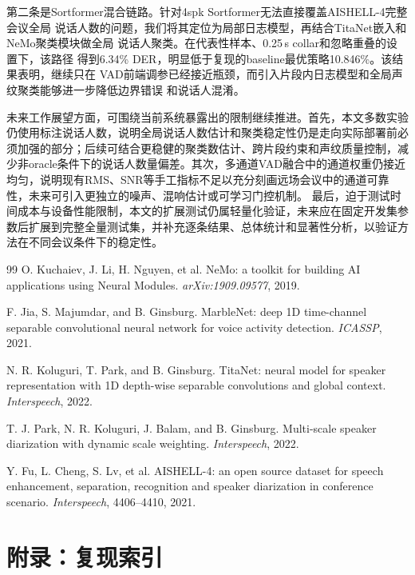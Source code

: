\documentclass[UTF8,a4paper,10pt]{ctexart}
\begin{document}
第二条是Sortformer混合链路。针对4spk Sortformer无法直接覆盖AISHELL-4完整会议全局
说话人数的问题，我们将其定位为局部日志模型，再结合TitaNet嵌入和NeMo聚类模块做全局
说话人聚类。在代表性样本、0.25\,s collar和忽略重叠的设置下，该路径
得到6.34\% DER，明显低于复现的baseline最优策略10.846\%。该结果表明，继续只在
VAD前端调参已经接近瓶颈，而引入片段内日志模型和全局声纹聚类能够进一步降低边界错误
和说话人混淆。

未来工作展望方面，可围绕当前系统暴露出的限制继续推进。首先，本文多数实验仍使用标注说话人数，说明全局说话人数估计和聚类稳定性仍是走向实际部署前必须加强的部分；后续可结合更稳健的聚类数估计、跨片段约束和声纹质量控制，减少非oracle条件下的说话人数量偏差。其次，多通道VAD融合中的通道权重仍接近均匀，说明现有RMS、SNR等手工指标不足以充分刻画远场会议中的通道可靠性，未来可引入更独立的噪声、混响估计或可学习门控机制。
最后，迫于测试时间成本与设备性能限制，本文的扩展测试仍属轻量化验证，未来应在固定开发集参数后扩展到完整全量测试集，并补充逐条结果、总体统计和显著性分析，以验证方法在不同会议条件下的稳定性。


\newpage
\begin{thebibliography}{99}
O. Kuchaiev, J. Li, H. Nguyen, et al.
NeMo: a toolkit for building AI applications using Neural Modules.
\textit{arXiv:1909.09577}, 2019.

F. Jia, S. Majumdar, and B. Ginsburg.
MarbleNet: deep 1D time-channel separable convolutional neural network for
voice activity detection. \textit{ICASSP}, 2021.

N. R. Koluguri, T. Park, and B. Ginsburg.
TitaNet: neural model for speaker representation with 1D depth-wise separable
convolutions and global context. \textit{Interspeech}, 2022.

T. J. Park, N. R. Koluguri, J. Balam, and B. Ginsburg.
Multi-scale speaker diarization with dynamic scale weighting.
\textit{Interspeech}, 2022.

Y. Fu, L. Cheng, S. Lv, et al.
AISHELL-4: an open source dataset for speech enhancement, separation,
recognition and speaker diarization in conference scenario.
\textit{Interspeech}, 4406--4410, 2021.
\end{thebibliography}

\newpage
\appendix
\section{附录：复现索引}
\end{document}
